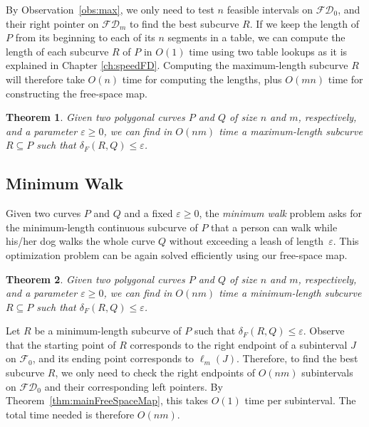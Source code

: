 \documentclass[12pt]{dalthesis}
\def\favoritefont{\bfseries \sffamily}
\def\QED{\ensuremath{{\Box}}}
\def\markatright#1{\leavevmode\unskip\nobreak\quad\hspace*{\fill}{#1}}
\newenvironment{proof}
	{\begin{trivlist}\item[\hskip\labelsep{\favoritefont Proof:}]}
	{\markatright{\QED}\end{trivlist}}
\newtheorem{theorem}{Theorem}
\newcommand{\qed}{}
\newcommand{\lee}{\leqslant}
\newcommand{\gee}{\geqslant}
\newcommand{\eps}{\varepsilon}
\newcommand{\CF}{{\mathscr F}}
\newcommand{\distF}{\delta_F}
\newcommand{\fs}{free-space }
\newcommand{\FD}{\mathscr {FD}}
\newcommand{\F}{\CF}
\newcommand{\lp}{\ell}
\begin{document}
By Observation~\ref{obs:max}, we only need to test $n$
feasible intervals on $\FD_0$, and their right pointer on $\FD_m$
to find the best subcurve $R$. 
If we keep the length of $P$ from its beginning to each of its $n$ segments in a table,
we can compute the length of each subcurve $R$ of $P$ 
in $O(1)$ time using two table lookups as 
it is explained in Chapter \ref{ch:speedFD}.
Computing the maximum-length subcurve $R$ will
therefore take $O(n)$ time for computing the lengths, 
plus $O(mn)$ time for constructing the \fs map.

\begin{theorem} \label{thm:max}
	Given two polygonal curves $P$ and $Q$ of size $n$ and $m$, respectively,
	and a parameter $\eps \gee 0$,
	we can find in $O(nm)$ time a maximum-length subcurve $R \subseteq P$ such that 
	$\distF(R,Q) \lee \eps$.
\end{theorem}


\subsection{Minimum Walk}

Given two curves $P$ and $Q$ and a fixed $\eps \gee 0$, 
the \emph{minimum walk} problem asks for the minimum-length continuous subcurve of
$P$ that a person can walk while his/her dog walks the whole curve $Q$
without exceeding a leash of length~$\eps$. 
This optimization problem can be again solved efficiently 
using our \fs map. 

\begin{theorem} \label{thm:min}
	Given two polygonal curves $P$ and $Q$ of size $n$ and $m$, respectively,
	and a parameter $\eps \gee 0$,
	we can find in $O(nm)$ time a minimum-length subcurve $R \subseteq P$ such that 
	$\distF(R,Q) \lee \eps$.
\end{theorem}

\begin{proof}
	Let $R$ be a minimum-length subcurve of $P$ such that $\distF(R,Q) \lee \eps$.
	Observe that the starting point of $R$ corresponds to 
	the right endpoint of a subinterval $J$ on $\F_0$,
	and its ending point corresponds to $\lp_m(J)$. 
	Therefore, to find the best subcurve $R$, 
	we only need to check the right endpoints of $O(nm)$
	subintervals on $\FD_0$ and their corresponding left pointers.
	By Theorem~\ref{thm:mainFreeSpaceMap}, this takes $O(1)$ time per subinterval.
	The total time needed is therefore $O(nm)$.
	\qed
\end{proof}
\end{document}

